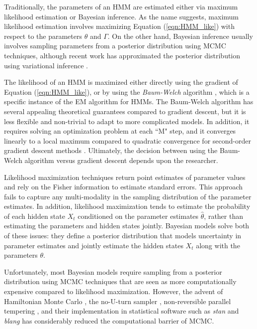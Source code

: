 
Traditionally, the parameters of an HMM are estimated either via maximum likelihood estimation or Bayesian inference. As the name suggests, maximum likelihood estimation involves maximizing Equation (\ref{eqn:HMM_like}) with respect to the parameters $\theta$ and $\Gamma$. On the other hand, Bayesian inference usually involves sampling parameters from a posterior distribution using MCMC techniques, although recent work has approximated the posterior distribution using variational inference \citep{Foti:2014}.

The likelihood of an HMM is maximized either directly using the gradient of Equation (\ref{eqn:HMM_like}), or by using the \textit{Baum-Welch} algorithm \citep{Baum:1970}, which is a specific instance of the EM algorithm for HMMs. The Baum-Welch algorithm has several appealing theoretical guarantees compared to gradient descent, but it is less flexible and non-trivial to adapt to more complicated models. In addition, it requires solving an optimization problem at each ``M" step, and it converges linearly to a local maximum compared to quadratic convergence for second-order gradient descent methods \citep{Khreich:2012}. Ultimately, the decision between using the Baum-Welch algorithm versus gradient descent depends upon the researcher.

Likelihood maximization techniques return point estimates of parameter values and rely on the Fisher information to estimate standard errors. This approach fails to capture any multi-modality in the sampling distribution of the parameter estimates. In addition, likelihood maximization tends to estimate the probability of each hidden state $X_t$ conditioned on the parameter estimates $\hat \theta$, rather than estimating the parameters and hidden states jointly. Bayesian models solve both of these issues: they define a posterior distribution that models uncertainty in parameter estimates and jointly estimate the hidden states $X_t$ along with the parameters $\theta$. 

Unfortunately, most Bayesian models require sampling from a posterior distribution using MCMC techniques that are seen as more computationally expensive compared to likelihood maximization. However, the advent of Hamiltonian Monte Carlo \citep{Neal:2012}, the no-U-turn sampler \citep{Homan:2014}, non-reversible parallel tempering \citep{Syed:2019,Sacchi:2021}, and their implementation in statistical software such as \textit{stan} \citep{Stan:2021} and \textit{blang} \citep{Bouchard:2021} has considerably reduced the computational barrier of MCMC.

